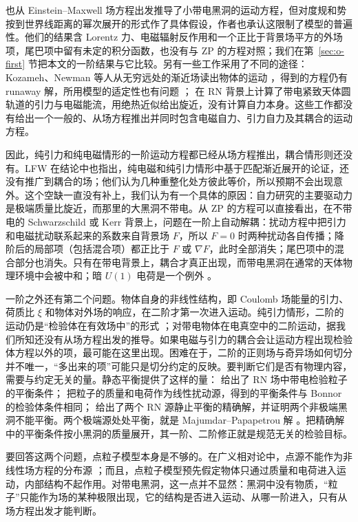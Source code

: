\documentclass[11pt,a4paper]{ctexart}
\begin{document}
\citet{FutamaseHoganItoh2008} 也从 Einstein--Maxwell 场方程出发推导了小带电黑洞的运动方程，但对度规和势按到世界线距离的幂次展开的形式作了具体假设，作者也承认这限制了模型的普遍性。他们的结果含 Lorentz 力、电磁辐射反作用和一个正比于背景场平方的外场项，尾巴项中留有未定的积分函数，也没有与 ZP 的方程对照；我们在第~\ref{sec:o-first} 节把本文的一阶结果与它比较。另有一些工作采用了不同的途径：Kozameh、Newman 等人从无穷远处的渐近场读出物体的运动 \citep{KozamehNewmanOrtegaSilva2009}，得到的方程仍有 runaway 解，所用模型的适定性也有问题 \citep{KozamehKreissReula2008}；\citet{BurtonOsburn2020} 在 RN 背景上计算了带电紧致天体圆轨道的引力与电磁能流，用绝热近似给出旋近，没有计算自力本身。这些工作都没有给出一个一般的、从场方程推出并同时包含电磁自力、引力自力及其耦合的运动方程。

因此，纯引力和纯电磁情形的一阶运动方程都已经从场方程推出，耦合情形则还没有。LFW 在结论中也指出，纯电磁和纯引力情形中基于匹配渐近展开的论证，还没有推广到耦合的场；他们认为几种重整化处方彼此等价，所以预期不会出现意外。这个空缺一直没有补上，我们认为有一个具体的原因：自力研究的主要驱动力是极端质量比旋近，而那里的大黑洞不带电。从 ZP 的方程可以直接看出，在不带电的 Schwarzschild 或 Kerr 背景上，问题在一阶上自动解耦：扰动方程中把引力和电磁扰动联系起来的系数来自背景场 $F$，所以 $F=0$ 时两种扰动各自传播；降阶后的局部项（包括混合项）都正比于 $F$ 或 $\nabla F$，此时全部消失；尾巴项中的混合部分也消失。只有在带电背景上，耦合才真正出现，而带电黑洞在通常的天体物理环境中会被中和；暗 $U(1)$ 电荷是一个例外 \citep{Cardoso2016}。

一阶之外还有第二个问题。物体自身的非线性结构，即 Coulomb 场能量的引力、荷质比 $\xi$ 和物体对外场的响应，在二阶才第一次进入运动。纯引力情形，二阶的运动仍是“检验体在有效场中”的形式 \citep{Gralla2012,Pound2012,Pound2017}；对带电物体在电真空中的二阶运动，据我们所知还没有从场方程出发的推导。如果电磁与引力的耦合会让运动方程出现检验体方程以外的项，最可能在这里出现。困难在于，二阶的正则场与奇异场如何切分并不唯一，“多出来的项”可能只是切分约定的反映。要判断它们是否有物理内容，需要与约定无关的量。静态平衡提供了这样的量：\citet{Bonnor1993} 给出了 RN 场中带电检验粒子的平衡条件；\citet{BiniGeralicoRuffini2007} 把粒子的质量和电荷作为线性扰动源，得到的平衡条件与 Bonnor 的检验体条件相同；\citet{AlekseevBelinski2007} 给出了两个 RN 源静止平衡的精确解，并证明两个非极端黑洞不能平衡。两个极端源处处平衡，就是 Majumdar--Papapetrou 解 \citep{Majumdar1947,Papapetrou1947}。把精确解中的平衡条件按小黑洞的质量展开，其一阶、二阶修正就是规范无关的检验目标。

要回答这两个问题，点粒子模型本身是不够的。在广义相对论中，点源不能作为非线性场方程的分布源 \citep{GerochTraschen1987}；而且，点粒子模型预先假定物体只通过质量和电荷进入运动，内部结构不起作用。对带电黑洞，这一点并不显然：黑洞中没有物质，“粒子”只能作为场的某种极限出现，它的结构是否进入运动、从哪一阶进入，只有从场方程出发才能判断。
\end{document}
